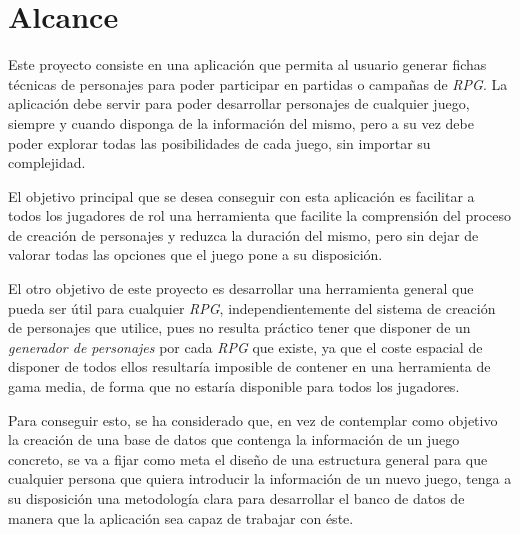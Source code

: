 
\section{Alcance}
Este proyecto consiste en una aplicación que permita al usuario generar fichas técnicas de personajes para 
poder participar en partidas o campañas de \textit{RPG}. La aplicación debe servir para poder desarrollar 
personajes de cualquier juego, siempre y cuando disponga de la información del mismo, pero a su vez debe 
poder explorar todas las posibilidades de cada juego, sin importar su complejidad. \medskip

El objetivo principal que se desea conseguir con esta aplicación es facilitar a todos los jugadores de rol una 
herramienta que facilite la comprensión del proceso de creación de personajes y reduzca la duración del mismo,
pero sin dejar de valorar todas las opciones que el juego pone a su disposición. \medskip

El otro objetivo de este proyecto es desarrollar una herramienta general que pueda ser útil para cualquier \textit{RPG},
independientemente del sistema de creación de personajes que utilice, pues no resulta práctico tener que disponer de 
un \textit{generador de personajes} por cada \textit{RPG} que existe, ya que el coste espacial de disponer de todos ellos 
resultaría imposible de contener en una herramienta de gama media, de forma que no estaría disponible para todos los jugadores.
\medskip

Para conseguir esto, se ha considerado que, en vez de contemplar como objetivo la creación de una base de datos que 
contenga la información de un juego concreto, se va a fijar como meta el diseño de una estructura general para que 
cualquier persona que quiera introducir la información de un nuevo juego, tenga a su disposición una metodología clara 
para desarrollar el banco de datos de manera que la aplicación sea capaz de trabajar con éste.

